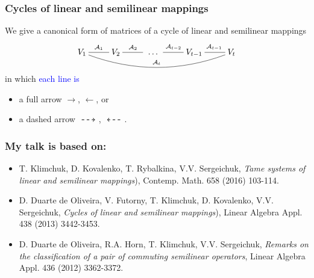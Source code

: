\documentclass[usenames,dvipsnames]{beamer}
\renewcommand{\dashrightarrow}
{\text{\raisebox{0.9mm} {\
\begin{tikzpicture}[->,thick,xscale=0.56]
  \draw[dashed] (0,0)--(1,0)
;
\end{tikzpicture}}\ }}
\renewcommand{\dashleftarrow}
{\text{\raisebox{0.9mm} {\
\begin{tikzpicture}[<-,thick,xscale=0.56]
  \draw[dashed] (0,0)--(1,0)
;
\end{tikzpicture}}\ }}
\begin{document}
\begin{frame}
\frametitle{Cycles of linear and
semilinear mappings}


We give a canonical form of matrices of
a \alert{cycle of linear and semilinear
mappings}
\[
\xymatrix{
{V_1}
\ar@{-}@/_1.5pc/[rrrr]^{\mathcal A_t}
\ar@{-}[r]^{\mathcal A_1}&
V_2\ar@{-}[r]^{\mathcal A_2\ } &
{\ \dots\ }&{V_{t-1}}
\ar@{-}[l]_{\mathcal A_{t-2}}
\ar@{-}[r]^{\ \mathcal A_{t-1}}&{V_t}}
\]
in which \textcolor{blue}{each line is}
\begin{itemize}
  \item a full arrow
      \alert{$\longrightarrow$},
      \alert{$\longleftarrow$}, or
  \item a dashed arrow
      \alert{$\dashrightarrow$},
      \alert{$\dashleftarrow$}.
\end{itemize}


\end{frame}



\begin{frame}
\frametitle{My talk is based on:}

\begin{itemize}

  \item \alert{T. Klimchuk,
  D. Kovalenko, T. Rybalkina,
  V.V. Sergeichuk}, {\it Tame systems
  of linear and semilinear mappings}),
   Contemp. Math. 658 (2016) 103-114.
\bigskip
\bigskip


  \item \alert{D. Duarte de
      Oliveira, V. Futorny, T.
      Klimchuk, D. Kovalenko, V.V.
      Sergeichuk}, {\it Cycles of
      linear and semilinear
      mappings}), Linear Algebra
      Appl. 438 (2013) 3442-3453.
\bigskip
\bigskip

  \item \alert{D. Duarte de
      Oliveira, R.A. Horn, T.
      Klimchuk, V.V. Sergeichuk},
      {\it Remarks on the
      classification of a pair of
      commuting semilinear
      operators}, Linear Algebra
      Appl. 436 (2012) 3362-3372.



\end{itemize}



\end{frame}
\end{document}
